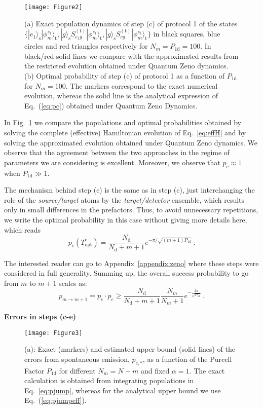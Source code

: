 \documentclass[twocolumn,pra,aps,superscriptaddress,showpacs]{revtex4-1}
\newcommand{\ket}[1]{|#1\rangle}
\def\oned{\mathrm{1d}}
\newcommand{\trg}{\mathrm{(t)}}
\newcommand{\rs}{\mathrm{s}}
\newcommand{\rd}{\mathrm{d}}
\newcommand{\rt}{\mathrm{t}}
\begin{document}
\begin{figure}[t]
	\centering
	\texttt{[image: Figure2]}
	\caption{
		(a) Exact population dynamics of step (c) of protocol 1 of the states $\{\ket{e_1}_\rs \ket{\phi_m^{s_1}}_\rt,\ket{g}_\rs S_{e_1 g}^\trg \ket{\phi_m^{s_1}}_\rt, \ket{g}_\rs S_{c g}^\trg \ket{\phi_m^{s_1}}_\rt\}$ in black squares, blue circles and red triangles respectively for $N_m=P_\oned=100$. In black/red solid lines we compare with the approximated results from the restricted evolution obtained under Quantum Zeno dynamics. (b) Optimal probability of step (c) of protocol 1 as a function of $P_\oned$ for $N_m=100$. The markers correspond to the exact numerical evolution, whereas the solid line is the analytical expression of Eq.~(\ref{eq:pc}) obtained under Quantum Zeno Dynamics.
	}
	\label{fig:numerical}
\end{figure}

In Fig.~\ref{fig:numerical} we compare the populations and optimal probabilities obtained by solving the complete (effective) Hamiltonian evolution of Eq.~\ref{eq:effH} and by solving the approximated evolution obtained under Quantum Zeno dynamics. We observe that the agreement between the two approaches in the regime of parameters we are considering is excellent. Moreover, we observe that $p_c\approx 1$ when $P_\oned\gg 1$.

The mechanism behind step (e) is the same as in step (c), just interchanging the role of the \emph{source/target} atoms by the \emph{target/detector} ensemble, which results only in small differences in the prefactors. Thus, to avoid unnecessary repetitions, we write the optimal probability in this case without giving more details here, which reads
%
\begin{equation} \label{eq:pe}
p_e(T^e_\mathrm{opt})
	= \frac{N_\rd}{N_\rd + m+1} e^{- \pi / \sqrt{(m+1) P_\oned}}\,.
\end{equation}

The interested reader can go to Appendix~\ref{appendix:zeno} where these steps were considered in full generality. Summing up, the overall success probability to go from $m$ to $m+1$ scales as:
%
\begin{equation} \label{eq:probI}
p_{m\rightarrow m+1}
	= p_c \cdot p_e
	\geq \frac{N_\rd}{N_\rd + m+1}\frac{N_m}{N_m+1}e^{-\frac{2 \pi}{\sqrt{P_\oned}}}\,.
\end{equation}

\textbf{Errors in steps (c-e)}

\begin{figure}[t]
	\centering
	\texttt{[image: Figure3]}
	\caption{(a): Exact (markers) and estimated upper bound (solid lines) of the errors from spontaneous emission, $p_{c,*}$, as a function of the Purcell Factor $P_\oned$ for different $N_m = N-m$ and fixed $\alpha=1$. The exact calculation is obtained from integrating populations in Eq.~\ref{eq:pjump}, whereas for the analytical upper bound we use Eq.~(\ref{eq:pjumpeff}). }
	\label{fig:pjump}
\end{figure}
\end{document}
